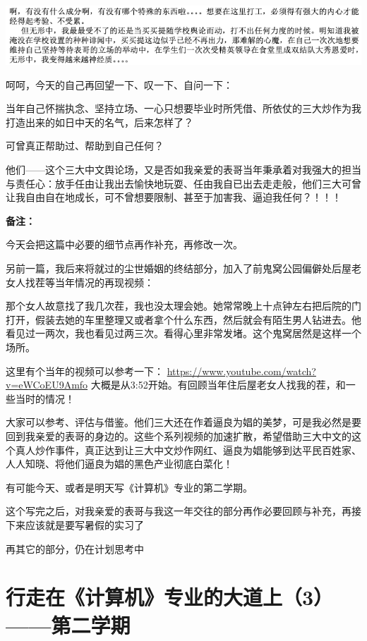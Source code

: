 \documentclass[9pt, b5paper]{article}
\begin{document}
\begin{center}
\includegraphics[width=.9\linewidth]{./pic/backups_plans_20210424_130121.png}
\end{center}

呵呵，今天的自己再回望一下、叹一下、自问一下：

当年自己怀揣执念、坚持立场、一心只想要毕业时所凭借、所依仗的三大炒作为我打造出来的如日中天的名气，后来怎样了？

可曾真正帮助过、帮助到自己任何？

他们——这个三大中文舆论场，又是否如我亲爱的表哥当年秉承着对我强大的担当与责任心：放手任由让我出去愉快地玩耍、任由我自已出去走走般，他们三大可曾让我自由自在地成长，可不曾想要限制、甚至于加害我、逼迫我任何？！！！

\textbf{备注：}

今天会把这篇中必要的细节点再作补充，再修改一次。

另前一篇，我后来将就过的尘世婚姻的终结部分，加入了前鬼窝公园偏僻处后屋老女人找茬等当年情况的再现视频：

那个女人故意找了我几次茬，我也没太理会她。她常常晚上十点钟左右把后院的门打开，假装去她的车里整理又或者拿个什么东西，然后就会有陌生男人钻进去。他看见过一两次，我也看见过两三次。看得心里非常发堵。这个鬼窝居然是这样一个场所。 

这里有个当年的视频可以参考一下： \url{https://www.youtube.com/watch?v=eWCoEU9Amfo} 大概是从3:52开始。有回顾当年住后屋老女人找我的茬，和一些当时的情况！

大家可以参考、评估与借鉴。他们三大还在作着逼良为娼的美梦，可是我必然是要回到我亲爱的表哥的身边的。这些个系列视频的加速扩散，希望借助三大中文的这个真人炒作事件，真正达到让三大中文炒作网红、逼良为娼能够到达平民百姓家、人人知晓、将他们逼良为娼的黑色产业彻底白菜化！

有可能今天、或者是明天写《计算机》专业的第二学期。

这个写完之后，对我亲爱的表哥与我这一年交往的部分再作必要回顾与补充，再接下来应该就是要写暑假的实习了

再其它的部分，仍在计划思考中

\section{行走在《计算机》专业的大道上（3）——第二学期}
\label{sec:org2340673}
\end{document}
